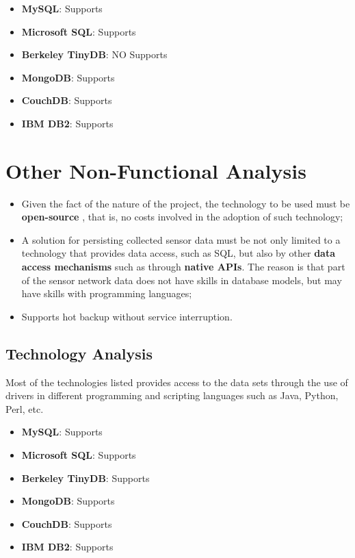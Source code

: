 \begin{itemize}
  \item \textbf{MySQL}: Supports
  \item \textbf{Microsoft SQL}: Supports
  \item \textbf{Berkeley TinyDB}: NO Supports
  \item \textbf{MongoDB}: Supports
  \item \textbf{CouchDB}: Supports
  \item \textbf{IBM DB2}: Supports
\end{itemize}

\section{Other Non-Functional Analysis}

\begin{itemize}
  \item Given the fact of the nature of the project, the technology to be used
  must be \textbf{open-source} \cite{open-source}, that is, no costs involved
  in the adoption of such technology;
  \item A solution for persisting collected sensor data must be not only limited
  to a technology that provides data access, such as SQL, but also by other
  \textbf{data access mechanisms} such as through \textbf{native APIs}. The
  reason is that part of the sensor network data does not have skills in
  database models, but may have skills with programming languages;
  \item Supports hot backup without service interruption.
\end{itemize}

\subsection{Technology Analysis}

Most of the technologies listed provides access to the data sets through the
use of drivers in different programming and scripting languages such as Java,
Python, Perl, etc.

\begin{itemize}
  \item \textbf{MySQL}: Supports
  \item \textbf{Microsoft SQL}: Supports
  \item \textbf{Berkeley TinyDB}: Supports
  \item \textbf{MongoDB}: Supports
  \item \textbf{CouchDB}: Supports
  \item \textbf{IBM DB2}: Supports
\end{itemize}

